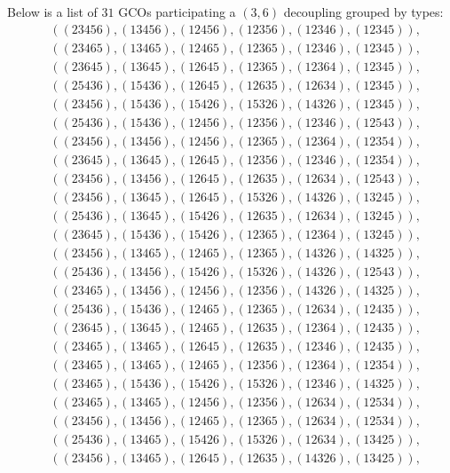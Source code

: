 \documentclass[pdftex]{sigma}
\theoremstyle{definition}
\numberwithin{equation}{section}
\begin{document}
 Below is a list of $31$ GCOs participating a $(3,6)$ decoupling grouped by types:
\begin{align}
&((23456),(13456),(12456),(12356),(12346),(12345)),\nonumber\\
& ((23465),(13465),(12465),(12365),(12346),(12345)),
\nonumber
\\
&((23645),(13645),(12645),(12365),(12364),(12345)),\nonumber\\
& ((25436),(15436),(12645),(12635),(12634),(12345)),
\nonumber
\\
&((23456),(15436),(15426),(15326),(14326),(12345)),
\nonumber
\\[3mm]
&
((25436),(15436),(12456),(12356),(12346),(12543)),
\nonumber\\
& ((23456),(13456),(12456),(12365),(12364),(12354)),
\nonumber
\\
&
((23645),(13645),(12645),(12356),(12346),(12354)),\nonumber\\
& ((23456),(13456),(12645),(12635),(12634),(12543)),
\nonumber
\\
&
((23456),(13645),(12645),(15326),(14326),(13245)),
\nonumber\\
& ((25436),(13645),(15426),(12635),(12634),(13245)),
\nonumber
\\
&
((23645),(15436),(15426),(12365),(12364),(13245)),\nonumber\\
& ((23456),(13465),(12465),(12365),(14326),(14325)),
\nonumber
\\
&
((25436),(13456),(15426),(15326),(14326),(12543)),
\nonumber\\
& ((23465),(13456),(12456),(12356),(14326),(14325)),
\nonumber
\\
&
((25436),(15436),(12465),(12365),(12634),(12435)),
\nonumber\\
& ((23645),(13645),(12465),(12635),(12364),(12435)),
\nonumber
\\
&
((23465),(13465),(12645),(12635),(12346),(12435)),
\nonumber\\
& ((23465),(13465),(12465),(12356),(12364),(12354)),
\nonumber
\\
&
((23465),(15436),(15426),(15326),(12346),(14325)),
\nonumber
\\[3mm]
&
((23465),(13465),(12456),(12356),(12634),(12534)),
\nonumber\\
& ((23456),(13456),(12465),(12365),(12634),(12534)),
\nonumber
\\
&
((25436),(13465),(15426),(15326),(12634),(13425)),
\nonumber\\
& ((23456),(13465),(12645),(12635),(14326),(13425)),

\end{align}
\end{document}
